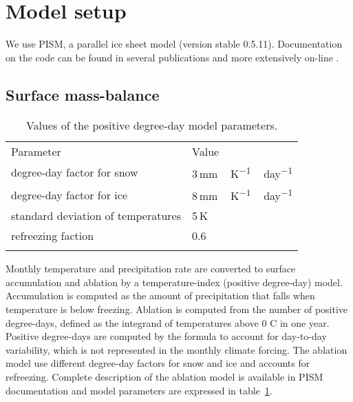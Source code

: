 
\section{Model setup}
\label{sec:model}

We use PISM, a parallel ice sheet model (version stable 0.5.11). Documentation on the code can be found in several publications \citep[e.g.,][]{bueler-brown-2009,winkelmann-etal-2011,aschwanden-etal-2012} and more extensively on-line \citep[{\url{http://www.pism-docs.org}},][]{web:pism}.

\subsection{Surface mass-balance}

\begin{table}[t]
	\caption{Values of the positive degree-day model parameters.}
	\label{tab:pdd}
	\vskip4mm
	\centering
	\begin{tabular}{ll}
		\tophline
		Parameter& Value\\
		\middlehline
		degree-day factor for snow & 3\,\unit{mm\,K^{-1}\,day^{-1}}\\
		degree-day factor for ice & 8\,\unit{mm\,K^{-1}\,day^{-1}}\\
		standard deviation of temperatures & 5\,K\\
		refreezing faction & 0.6 \\
		\bottomhline
	\end{tabular}
\end{table}

Monthly temperature and precipitation rate are converted to surface accumulation and ablation by a temperature-index (positive degree-day) model. Accumulation is computed as the amount of precipitation that falls when temperature is below freezing. Ablation is computed from the number of positive degree-days, defined as the integrand of temperatures above 0\,\degree\,C in one year. Positive degree-days are computed by the \citet{calov-greve-2011} formula to account for day-to-day variability, which is not represented in the monthly climate forcing. The ablation model use different degree-day factors for snow and ice and accounts for refreezing. Complete description of the ablation model is available in PISM documentation \citep[{\url{http://www.pism-docs.org}},][]{web:pism} and model parameters are expressed in table~\ref{tab:pdd}.

